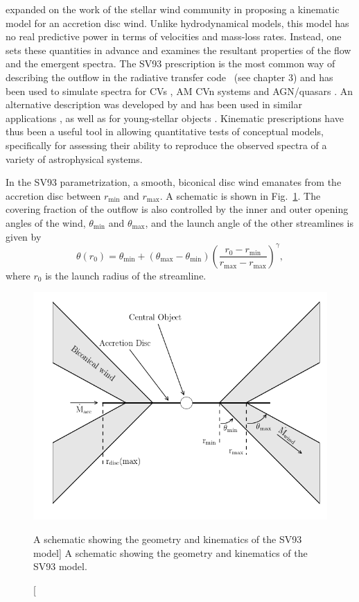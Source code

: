 \citet[][hereafter SV93]{SV93} 
expanded on the work of the stellar wind community \citep[e.g.][]{AL85} 
in proposing a kinematic model for an accretion disc wind. Unlike 
hydrodynamical models, this model has no real predictive power in terms of velocities
and mass-loss rates. Instead, one sets these quantities in advance and examines the 
resultant properties of the flow and the emergent spectra. The SV93 prescription
is the most common way of describing the outflow in the 
radiative transfer code \py\ (see chapter 3)
and has been used to simulate spectra for CVs \citep[][chapter 4]{LK02, M15}, 
AM CVn systems \citep{kusterer2014} and AGN/quasars 
\citep[][chapter 5]{higginbottom2013, M16, yong2016}. 
An alternative description was developed by \cite{KWD95} and has been used
in similar applications \citep{LK02, simlong2008, sim2010}, as 
well as for young-stellar objects \citep[YSOs;][]{simmacro2005}.
Kinematic prescriptions have thus been a useful tool in allowing quantitative
tests of conceptual models, specifically for assessing their ability to reproduce
the observed spectra of a variety of astrophysical systems.

In the SV93 parametrization,
a smooth, biconical disc wind emanates from the accretion disc between 
$r_{\mathrm{\mathrm{min}}}$ and $r_{\mathrm{\mathrm{max}}}$. A schematic is shown in Fig.~\ref{fig:sv93}.
The covering fraction of the outflow is 
also controlled by the inner and outer opening angles of the wind, $\theta_{\mathrm{min}}$ and
$\theta_{\mathrm{max}}$, and the launch angle of the other streamlines is given by 
\begin{equation}
\theta(r_0) = \theta_{\mathrm{min}} + (\theta_{\mathrm{max}} - \theta_{\mathrm{min}}) \left(\frac{r_0 - r_{\mathrm{min}}}{r_{\mathrm{max}} - r_{\mathrm{max}}} \right)^{\gamma},
\label{eq:wind_theta}
\end{equation}
where $r_0$ is the launch radius of the streamline.

\begin{figure}
\centering
\includegraphics[width=1.0\textwidth]{figures/02-outflows/cartoon_general.png}
\caption
[A schematic showing the geometry and kinematics of the SV93 model]
{
A schematic showing the geometry and kinematics of the SV93 model. 
} 
\label{fig:sv93}
\end{figure}

